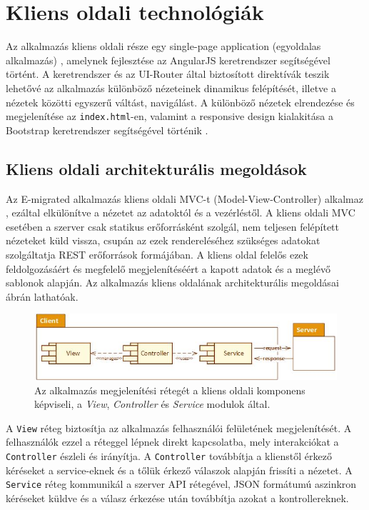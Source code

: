 \chapter{Kliens oldali technológiák}\label{ch:kliens}

\begin{osszefoglal}Az alkalmazás kliens oldali része egy single-page application (egyoldalas alkalmazás) \cite{SPA}, amelynek fejlesztése az AngularJS keretrendszer segítségével történt. A keretrendszer és az UI-Router által biztosított direktívák teszik lehetővé az alkalmazás különböző nézeteinek dinamikus felépítését, illetve a nézetek közötti egyszerű váltást, navigálást. A különböző nézetek elrendezése és megjelenítése az \texttt{index.html}-en, valamint a responsive design kialakitása a Bootstrap keretrendszer segítségével történik \cite{Bootstrap}.
\end{osszefoglal}

\section{Kliens oldali architekturális megoldások}
Az E-migrated alkalmazás kliens oldali MVC-t (Model-View-Controller) alkalmaz \cite{WebMVC}, ezáltal elkülönítve a nézetet az adatoktól és a vezérléstől. A kliens oldali MVC esetében a szerver csak statikus erőforrásként szolgál, nem teljesen felépített nézeteket küld vissza, csupán az ezek rendereléséhez szükséges adatokat szolgáltatja REST erőforrások formájában. A kliens oldal felelős ezek feldolgozásáért és megfelelő megjelenítéséért a kapott adatok és a meglévő sablonok alapján.
Az alkalmazás kliens oldalának architekturális megoldásai  ábrán lathatóak. 

\begin{figure}
  \centering
  \includegraphics[width=0.9\linewidth]{images/ClientArchitecture}
  \caption{Az alkalmazás megjelenítési rétegét a kliens oldali komponens képviseli, a \textit{View}, \textit{Controller} és \textit{Service} modulok által. }
  \label{fig:ClientArchitecture}
\end{figure}

A \texttt{View} réteg biztosítja az alkalmazás felhasználói felületének megjelenítését. A felhasználók ezzel a réteggel lépnek direkt kapcsolatba, mely interakciókat a \texttt{Controller} észleli és irányítja. A \texttt{Controller} továbbítja a klienstől érkező kéréseket a service-eknek és a tőlük érkező válaszok alapján frissíti a nézetet. A \texttt{Service} réteg kommunikál a szerver API rétegével, JSON formátumú aszinkron kéréseket küldve és a válasz érkezése után továbbítja azokat a kontrollereknek. 

